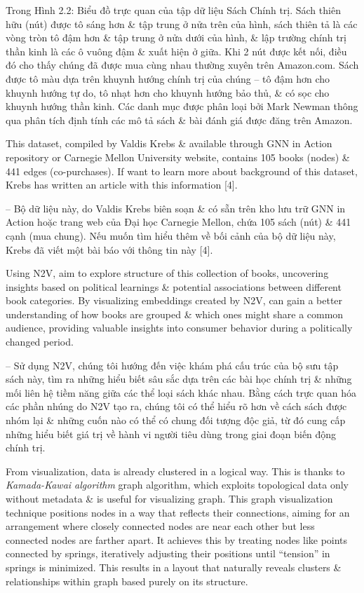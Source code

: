 \documentclass{article}
\begin{document}
\begin{itemize}
\begin{itemize}
\begin{enumerate}
        \end{enumerate}
        Trong {\sf Hình 2.2: Biểu đồ trực quan của tập dữ liệu Sách Chính trị. Sách thiên hữu (nút) được tô sáng hơn \& tập trung ở nửa trên của hình, sách thiên tả là các vòng tròn tô đậm hơn \& tập trung ở nửa dưới của hình, \& lập trường chính trị thần kinh là các ô vuông đậm \& xuất hiện ở giữa. Khi 2 nút được kết nối, điều đó cho thấy chúng đã được mua cùng nhau thường xuyên trên Amazon.com.} Sách được tô màu dựa trên khuynh hướng chính trị của chúng -- tô đậm hơn cho khuynh hướng tự do, tô nhạt hơn cho khuynh hướng bảo thủ, \& có sọc cho khuynh hướng thần kinh. Các danh mục được phân loại bởi {\sc Mark Newman} thông qua phân tích định tính các mô tả sách \& bài đánh giá được đăng trên Amazon.

        This dataset, compiled by {\sc Valdis Krebs} \& available through GNN in Action repository or Carnegie Mellon University website, contains 105 books (nodes) \& 441 edges (co-purchases). If want to learn more about background of this dataset, {\sc Krebs} has written an article with this information [4].

        -- Bộ dữ liệu này, do {\sc Valdis Krebs} biên soạn \& có sẵn trên kho lưu trữ GNN in Action hoặc trang web của Đại học Carnegie Mellon, chứa 105 sách (nút) \& 441 cạnh (mua chung). Nếu muốn tìm hiểu thêm về bối cảnh của bộ dữ liệu này, {\sc Krebs} đã viết một bài báo với thông tin này [4].

        Using N2V, aim to explore structure of this collection of books, uncovering insights based on political learnings \& potential associations between different book categories. By visualizing embeddings created by N2V, can gain a better understanding of how books are grouped \& which ones might share a common audience, providing valuable insights into consumer behavior during a politically changed period.

        -- Sử dụng N2V, chúng tôi hướng đến việc khám phá cấu trúc của bộ sưu tập sách này, tìm ra những hiểu biết sâu sắc dựa trên các bài học chính trị \& những mối liên hệ tiềm năng giữa các thể loại sách khác nhau. Bằng cách trực quan hóa các phần nhúng do N2V tạo ra, chúng tôi có thể hiểu rõ hơn về cách sách được nhóm lại \& những cuốn nào có thể có chung đối tượng độc giả, từ đó cung cấp những hiểu biết giá trị về hành vi người tiêu dùng trong giai đoạn biến động chính trị.

        From visualization, data is already clustered in a logical way. This is thanks to {\it Kamada-Kawai algorithm} graph algorithm, which exploits topological data only without metadata \& is useful for visualizing graph. This graph visualization technique positions nodes in a way that reflects their connections, aiming for an arrangement where closely connected nodes are near each other but less connected nodes are farther apart. It achieves this by treating nodes like points connected by springs, iteratively adjusting their positions until ``tension'' in springs is minimized. This results in a layout that naturally reveals clusters \& relationships within graph based purely on its structure.


\end{itemize}
\end{itemize}
\end{document}
